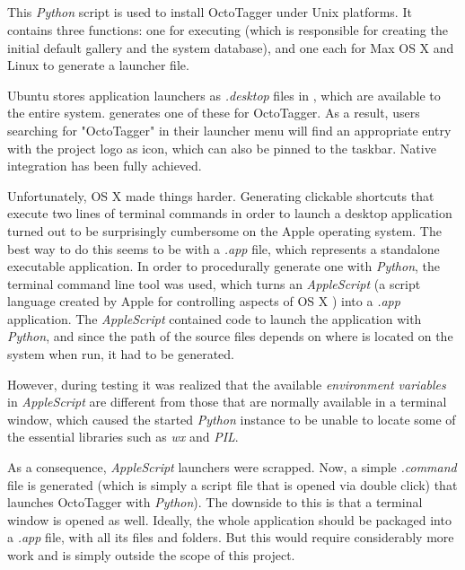 \subsection{}
\label{sub:mod:install}
\def\kapitelautor{Erik Ritschl}

This \emph{Python} script is used to install OctoTagger under Unix platforms. It contains three functions: one for executing  (which is responsible for creating the initial default gallery and the system database), and one each for Max OS X and Linux to generate a launcher file.

Ubuntu stores application launchers as \emph{.desktop} files  in , which are available to the entire system.  generates one of these for OctoTagger. As a result, users searching for "OctoTagger" in their launcher menu will find an appropriate entry with the project logo as icon, which can also be pinned to the taskbar. Native integration has been fully achieved.


Unfortunately, OS X made things harder. Generating clickable shortcuts that execute two lines of terminal commands in order to launch a desktop application turned out to be surprisingly cumbersome on the Apple operating system. The best way to do this seems to be with a \emph{.app} file, which represents a standalone executable application. In order to procedurally generate one with \emph{Python}, the terminal command line tool  was used, which turns an \emph{AppleScript} (a script language created by Apple for controlling aspects of OS X \cite{AppleScript}) into a \emph{.app} application. The \emph{AppleScript} contained code to launch the application with \emph{Python}, and since the path of the source files depends on where  is located on the system when run, it had to be generated. 

However, during testing it was realized that the available \emph{environment variables} \cite{EnvironmentVariables} in \emph{AppleScript} are different from those that are normally available in a terminal window, which caused the started \emph{Python} instance to be unable to locate some of the essential libraries such as \emph{wx} and \emph{PIL}.

As a consequence, \emph{AppleScript} launchers were scrapped. Now, a simple \emph{.command} file is generated (which is simply a script file that is opened via double click) that launches OctoTagger with \emph{Python}). The downside to this is that a terminal window is opened as well. Ideally, the whole application should be packaged into a \emph{.app} file, with all its files and folders. But this would require considerably more work and is simply outside the scope of this project.